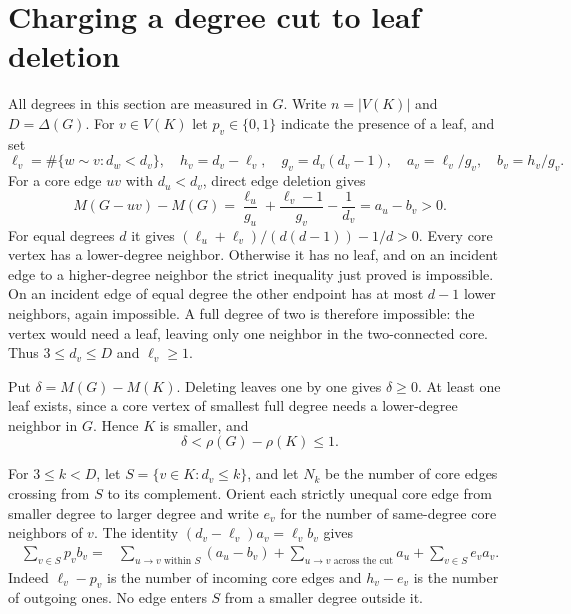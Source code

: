 \documentclass[11pt,a4paper]{article}
\begin{document}
\section{Charging a degree cut to leaf deletion}\label{p01-cuts}
All degrees in this section are measured in $G$. Write $n=|V(K)|$ and
$D=\Delta(G)$. For $v\in V(K)$ let $p_v\in\{0,1\}$ indicate the
presence of a leaf, and set
\[
 \ell_v=\#\{w\sim v:d_w<d_v\},\quad h_v=d_v-\ell_v,\quad
 g_v=d_v(d_v-1),\quad a_v=\ell_v/g_v,\quad b_v=h_v/g_v .
\]
For a core edge $uv$ with $d_u<d_v$, direct edge deletion gives
\[
 M(G-uv)-M(G)=\frac{\ell_u}{g_u}
                 +\frac{\ell_v-1}{g_v}-\frac1{d_v}
               =a_u-b_v>0 .
\]
For equal degrees $d$ it gives $(\ell_u+\ell_v)/(d(d-1))-1/d>0$.
Every core vertex has a lower-degree neighbor. Otherwise it has no
leaf, and on an incident edge to a higher-degree neighbor the strict
inequality just proved is impossible. On an incident edge of equal
degree the other endpoint has at most $d-1$ lower neighbors, again
impossible. A full degree of two is therefore impossible: the vertex
would need a leaf, leaving only one neighbor in the two-connected
core. Thus $3\le d_v\le D$ and $\ell_v\ge1$.

Put $\delta=M(G)-M(K)$. Deleting leaves one by one gives $\delta\ge0$.
At least one leaf exists, since a core vertex of smallest full degree
needs a lower-degree neighbor in $G$. Hence $K$ is smaller, and
\[
 \delta<\rho(G)-\rho(K)\le1.
\]

For $3\le k<D$, let $S=\{v\in K:d_v\le k\}$, and let $N_k$ be the
number of core edges crossing from $S$ to its complement. Orient each
strictly unequal core edge from smaller degree to larger degree and
write $e_v$ for the number of same-degree core neighbors of $v$.
The identity $(d_v-\ell_v)a_v=\ell_v b_v$ gives
\begin{align*}
 \sum_{v\in S}p_v b_v
  ={}&\sum_{u\to v\text{ within } S}(a_u-b_v)
      +\sum_{u\to v\text{ across the cut}} a_u
      +\sum_{v\in S}e_v a_v .
\end{align*}
Indeed $\ell_v-p_v$ is the number of incoming core edges and
$h_v-e_v$ is the number of outgoing ones. No edge enters $S$ from
a smaller degree outside it.
\end{document}
